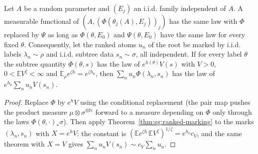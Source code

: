 \begin{theorem}\label{thm:sg:root-step}
  \leanok
Let $A$ be a random parameter and $(E_j)$ an i.i.d. family independent of $A$. A measurable
functional of $(A,(\Phi(\theta_j(A),E_j))_j)$ has the same law with $\Phi$ replaced by $\Psi$ as long as
$\Phi(\theta,E_0)$ and $\Psi(\theta,E_0)$ have the same law for every fixed $\theta$.
Consequently, let the ranked atoms $u_n$ of the root be marked by i.i.d. labels $\lambda_n\sim\rho$ and
i.i.d. subtree data $s_n\sim\sigma$, all independent. If for every label $\theta$ the subtree
quantity $\Phi(\theta,s)$ has the law of $e^{h(\theta)}V(s)$ with $V>0$,
$0<\mathbb E V^{\zeta}<\infty$ and $\mathbb E_\rho e^{\zeta h}=e^{\zeta h_0}$, then
$\sum_nu_n\Phi(\lambda_n,s_n)$ has the law of $e^{h_0}\sum_nu_nV(s_n)$.
\end{theorem}
\begin{proof}
  \leanok
Replace $\Phi$ by $e^hV$ using the conditional replacement (the pair map pushes the product measure
$\mu\otimes\sigma^{\otimes\mathbb N}$ forward to a measure depending on $\Phi$ only through the
laws $\Phi(\theta,\cdot)_*\sigma$). Then apply Theorem~\ref{thm:sg:ranked-marking} to the marks
$(\lambda_n,s_n)$ with $X=e^{h}V$: the constant is $(\mathbb E e^{\zeta h}\,\mathbb E V^\zeta)^{1/\zeta}=e^{h_0}c_V$,
and the same theorem with $X=V$ gives $\sum_nu_nV(s_n)\sim c_V\sum_nu_n$.
\end{proof}

